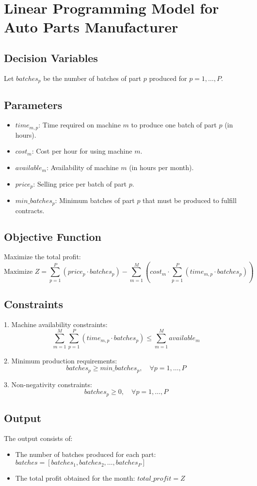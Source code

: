 \documentclass{article}
\begin{document}
\section*{Linear Programming Model for Auto Parts Manufacturer}

\subsection*{Decision Variables}
Let \(batches_{p}\) be the number of batches of part \(p\) produced for \(p = 1, \ldots, P\).

\subsection*{Parameters}
\begin{itemize}
    \item \(time_{m,p}\): Time required on machine \(m\) to produce one batch of part \(p\) (in hours).
    \item \(cost_{m}\): Cost per hour for using machine \(m\).
    \item \(available_{m}\): Availability of machine \(m\) (in hours per month).
    \item \(price_{p}\): Selling price per batch of part \(p\).
    \item \(min\_batches_{p}\): Minimum batches of part \(p\) that must be produced to fulfill contracts.
\end{itemize}

\subsection*{Objective Function}
Maximize the total profit:
\[
\text{Maximize } Z = \sum_{p=1}^{P} (price_{p} \cdot batches_{p}) - \sum_{m=1}^{M} \left( cost_{m} \cdot \sum_{p=1}^{P} (time_{m,p} \cdot batches_{p}) \right)
\]

\subsection*{Constraints}
1. Machine availability constraints:
\[
\sum_{m=1}^{M} \sum_{p=1}^{P} (time_{m,p} \cdot batches_{p}) \leq \sum_{m=1}^{M} available_{m}
\]

2. Minimum production requirements:
\[
batches_{p} \geq min\_batches_{p}, \quad \forall p = 1, \ldots, P
\]

3. Non-negativity constraints:
\[
batches_{p} \geq 0, \quad \forall p = 1, \ldots, P
\]

\subsection*{Output}
The output consists of:
\begin{itemize}
    \item The number of batches produced for each part: \(batches = [batches_{1}, batches_{2}, \ldots, batches_{P}]\)
    \item The total profit obtained for the month: \(total\_profit = Z\)
\end{itemize}
\end{document}
